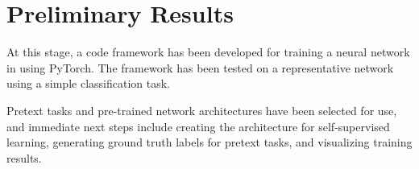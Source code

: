 \documentclass[10pt,twocolumn,letterpaper]{article}
\begin{document}
\section{Preliminary Results}
At this stage, a code framework has been developed for training a neural network in using PyTorch. The framework has been tested on a representative network using a simple classification task.

Pretext tasks and pre-trained network architectures have been selected for use, and immediate next steps include creating the architecture for self-supervised learning, generating ground truth labels for pretext tasks, and visualizing training results.

{\small


}
\end{document}
